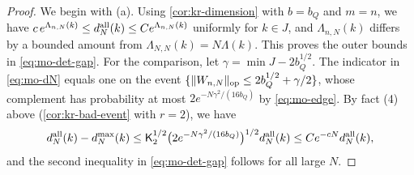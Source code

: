 \begin{proof}
We begin with (a). Using \cref{cor:kr-dimension} with $b=b_Q$ and $m=n$, we have $c\,e^{\Lambda_{n,N}(k)}\le d_N^{\rm all}(k)\le Ce^{\Lambda_{n,N}(k)}$ uniformly for $k\in J$, and $\Lambda_{n,N}(k)$ differs by a bounded amount from $\Lambda_{N,N}(k)=N\Lambda(k)$. This proves the outer bounds in \eqref{eq:mo-det-gap}. For the comparison, let $\gamma=\min J-2b_Q^{1/2}$. The indicator in \eqref{eq:mo-dN} equals one on the event $\{\|W_{n,N}\|_{\rm op}\le2b_Q^{1/2}+\gamma/2\}$, whose complement has probability at most $2e^{-N\gamma^2/(16b_Q)}$ by \eqref{eq:mo-edge}. By fact (4) above (\cref{cor:kr-bad-event} with $r=2$), we have
\[
d_N^{\rm all}(k)-d_N^{\max}(k)\le\mathsf K_2^{1/2}\bigl(2e^{-N\gamma^2/(16b_Q)}\bigr)^{1/2}d_N^{\rm all}(k)\le Ce^{-cN}d_N^{\rm all}(k),
\]
and the second inequality in \eqref{eq:mo-det-gap} follows for all large $N$.


\end{proof}
